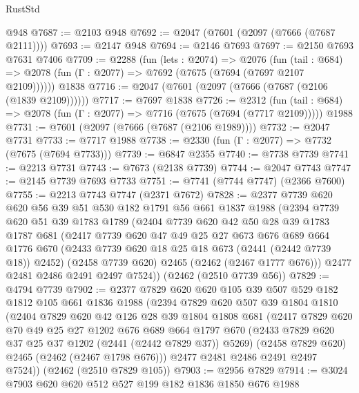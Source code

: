 \begin{lexlean}{RustStd}
\begin{coremodule}
    @948
@7687 := @2103 @948
@7692 := @2047 (@7601 (@2097 (@7666 (@7687 @2111))))
@7693 := @2147 @948
@7694 := @2146 @7693
@7697 := @2150 @7693 @7631 @7406
@7709 := @2288
    (fun (lets : @2074) =>
    @2076
      (fun (tail : @684) => @2078 (fun (Γ : @2077) => @7692 (@7675 (@7694 (@7697 @2107 @2109))))))
    @1838
@7716 := @2047 (@7601 (@2097 (@7666 (@7687 (@2106 (@1839 @2109))))))
@7717 := @7697 @1838
@7726 := @2312
    (fun (tail : @684) => @2078 (fun (Γ : @2077) => @7716 (@7675 (@7694 (@7717 @2109)))))
    @1988
@7731 := @7601 (@2097 (@7666 (@7687 (@2106 @1989))))
@7732 := @2047 @7731
@7733 := @7717 @1988
@7738 := @2330 (fun (Γ : @2077) => @7732 (@7675 (@7694 @7733)))
@7739 := @6847 @2355
@7740 := @7738 @7739
@7741 := @2213 @7731
@7743 := @7673 (@2138 @7739)
@7744 := @2047 @7743
@7747 := @2145 @7739 @7693 @7733
@7751 := @7741 (@7744 @7747) (@2366 @7600)
@7755 := @2213 @7743 @7747 (@2371 @7672)
@7828 := @2377
    @7739
    @620
    @620
    @56
    @39
    @51
    @530
    @182
    @1791
    @56
    @661
    @1837
    @1988
    (@2394
      @7739
      @620
      @51
      @39
      @1783
      @1789
      (@2404
        @7739
        @620
        @42
        @50
        @28
        @39
        @1783
        @1787
        @681
        (@2417
          @7739
          @620
          @47
          @49
          @25
          @27
          @673
          @676
          @689
          @664
          @1776
          @670
          (@2433 @7739 @620 @18 @25 @18 @673 (@2441 (@2442 @7739 @18)) @2452)
          (@2458 @7739 @620)
          @2465
          (@2462 (@2467 @1777 @676)))
        @2477
        @2481
        @2486
        @2491
        @2497
        @7524))
    (@2462 (@2510 @7739 @56))
@7829 := @4794 @7739
@7902 := @2377
    @7829
    @620
    @620
    @105
    @39
    @507
    @529
    @182
    @1812
    @105
    @661
    @1836
    @1988
    (@2394
      @7829
      @620
      @507
      @39
      @1804
      @1810
      (@2404
        @7829
        @620
        @42
        @126
        @28
        @39
        @1804
        @1808
        @681
        (@2417
          @7829
          @620
          @70
          @49
          @25
          @27
          @1202
          @676
          @689
          @664
          @1797
          @670
          (@2433 @7829 @620 @37 @25 @37 @1202 (@2441 (@2442 @7829 @37)) @5269)
          (@2458 @7829 @620)
          @2465
          (@2462 (@2467 @1798 @676)))
        @2477
        @2481
        @2486
        @2491
        @2497
        @7524))
    (@2462 (@2510 @7829 @105))
@7903 := @2956 @7829
@7914 := @3024 @7903 @620 @620 @512 @527 @199 @182 @1836 @1850 @676 @1988

\end{coremodule}
\end{lexlean}
